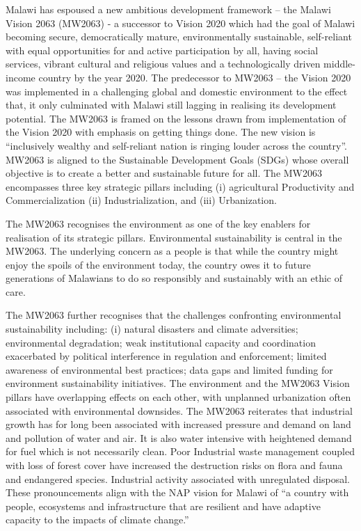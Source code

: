 \documentclass[
]{book}
\begin{document}
Malawi has espoused a new ambitious development framework -- the Malawi Vision 2063 (MW2063) - a successor to Vision 2020 which had the goal of Malawi becoming secure, democratically mature, environmentally sustainable, self-reliant with equal opportunities for and active participation by all, having social services, vibrant cultural and religious values and a technologically driven middle-income country by the year 2020. The predecessor to MW2063 -- the Vision 2020 was implemented in a challenging global and domestic environment to the effect that, it only culminated with Malawi still lagging in realising its development potential. The MW2063 is framed on the lessons drawn from implementation of the Vision 2020 with emphasis on getting things done. The new vision is ``inclusively wealthy and self-reliant nation is ringing louder across the country''. MW2063 is aligned to the Sustainable Development Goals (SDGs) whose overall objective is to create a better and sustainable future for all. The MW2063 encompasses three key strategic pillars including (i) agricultural Productivity and Commercialization (ii) Industrialization, and (iii) Urbanization.

The MW2063 recognises the environment as one of the key enablers for realisation of its strategic pillars. Environmental sustainability is central in the MW2063. The underlying concern as a people is that while the country might enjoy the spoils of the environment today, the country owes it to future generations of Malawians to do so responsibly and sustainably with an ethic of care.

The MW2063 further recognises that the challenges confronting environmental sustainability including: (i) natural disasters and climate adversities; environmental degradation; weak institutional capacity and coordination exacerbated by political interference in regulation and enforcement; limited awareness of environmental best practices; data gaps and limited funding for environment sustainability initiatives. The environment and the MW2063 Vision pillars have overlapping effects on each other, with unplanned urbanization often associated with environmental downsides. The MW2063 reiterates that industrial growth has for long been associated with increased pressure and demand on land and pollution of water and air. It is also water intensive with heightened demand for fuel which is not necessarily clean. Poor Industrial waste management coupled with loss of forest cover have increased the destruction risks on flora and fauna and endangered species. Industrial activity associated with unregulated disposal. These pronouncements align with the NAP vision for Malawi of ``a country with people, ecosystems and infrastructure that are resilient and have adaptive capacity to the impacts of climate change.''
\end{document}
